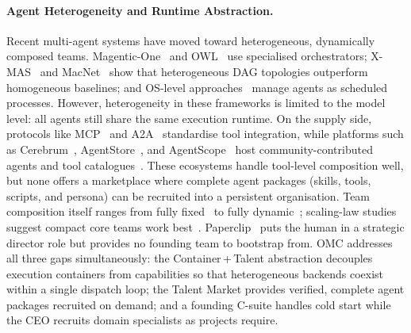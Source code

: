\documentclass[11pt,a4paper]{article}
\begin{document}
\paragraph{Agent Heterogeneity and Runtime Abstraction.}
Recent multi-agent systems have moved toward heterogeneous, dynamically composed teams.  Magentic-One~\cite{fourney2024magenticone} and OWL~\cite{hu2025owl} use specialised orchestrators; X-MAS~\cite{ye2025xmas} and MacNet~\cite{qian2025macnet} show that heterogeneous DAG topologies outperform homogeneous baselines; and OS-level approaches~\cite{agentforge2025, mei2025aios} manage agents as scheduled processes.  However, heterogeneity in these frameworks is limited to the model level: all agents still share the same execution runtime.  On the supply side, protocols like MCP~\cite{hou2025mcp} and A2A~\cite{google2025a2a} standardise tool integration, while platforms such as Cerebrum~\cite{rama2025cerebrum, mei2025aios}, AgentStore~\cite{jia2025agentstore}, and AgentScope~\cite{gao2025agentscope} host community-contributed agents and tool catalogues~\cite{yang2025sweagent, mcpzoo2025, singh2025registry, ehtesham2025interop}.  These ecosystems handle tool-level composition well, but none offers a marketplace where complete agent packages (skills, tools, scripts, and persona) can be recruited into a persistent organisation.  Team composition itself ranges from fully fixed~\cite{fourney2024magenticone, hu2025owl, teamofrivals2025} to fully dynamic~\cite{liu2025dylan, zhang2025aflow, shang2025agentsquare, hu2025evomac}; scaling-law studies suggest compact core teams work best~\cite{qian2025macnet, tran2025masurvey}.  Paperclip~\cite{paperclip2025} puts the human in a strategic director role but provides no founding team to bootstrap from.  OMC addresses all three gaps simultaneously: the Container\,+\,Talent abstraction decouples execution containers from capabilities so that heterogeneous backends coexist within a single dispatch loop; the Talent Market provides verified, complete agent packages recruited on demand; and a founding C-suite handles cold start while the CEO recruits domain specialists as projects require.
\end{document}
